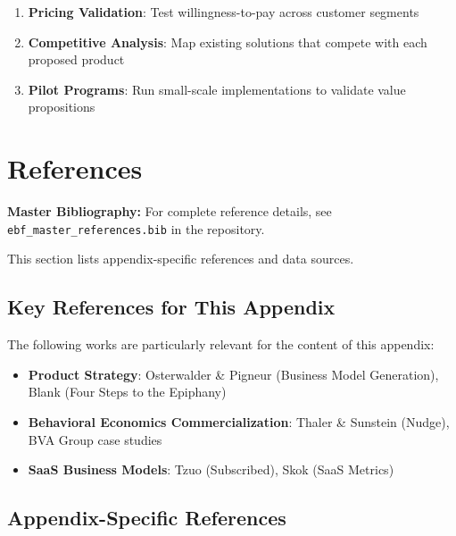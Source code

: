 \begin{enumerate}
    \item \textbf{Pricing Validation}: Test willingness-to-pay across customer segments
    \item \textbf{Competitive Analysis}: Map existing solutions that compete with each proposed product
    \item \textbf{Pilot Programs}: Run small-scale implementations to validate value propositions
\end{enumerate}


\section{References}

\nocite{bcm_master}

\label{sec:vvv3-references}

\begin{tcolorbox}[colback=blue!5!white, colframe=blue!75!black]
\textbf{Master Bibliography:} For complete reference details, see
\texttt{ebf\_master\_references.bib} in the repository.

This section lists appendix-specific references and data sources.
\end{tcolorbox}

\vspace{0.5em}

\subsection{Key References for This Appendix}

The following works are particularly relevant for the content of this appendix:

\begin{itemize}[nosep]
    \item \textbf{Product Strategy}: Osterwalder \& Pigneur (Business Model Generation), Blank (Four Steps to the Epiphany)
    \item \textbf{Behavioral Economics Commercialization}: Thaler \& Sunstein (Nudge), BVA Group case studies
    \item \textbf{SaaS Business Models}: Tzuo (Subscribed), Skok (SaaS Metrics)
\end{itemize}

\subsection{Appendix-Specific References}

